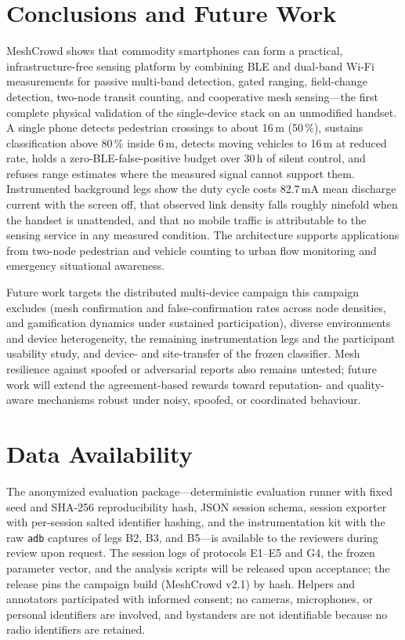 \documentclass[journal,10pt]{IEEEtran}
\begin{document}
\section{Conclusions and Future Work}
MeshCrowd shows that commodity smartphones can form a practical,
infrastructure-free sensing platform by combining BLE and dual-band Wi-Fi
measurements for passive multi-band detection, gated ranging, field-change
detection, two-node transit counting, and cooperative mesh sensing---the first
complete physical validation of the single-device stack on an unmodified
handset. A single phone detects pedestrian crossings to about 16\,m (50\,\%),
sustains classification above 80\,\% inside 6\,m, detects moving vehicles to
16\,m at reduced rate, holds a zero-BLE-false-positive budget over 30\,h of
silent control, and refuses range estimates where the measured signal cannot
support them. Instrumented background legs show the duty cycle costs 82.7\,mA
mean discharge current with the screen off, that observed link density falls
roughly ninefold when the handset is unattended, and that no mobile traffic is
attributable to the sensing service in any measured condition. The architecture
supports applications from two-node pedestrian and vehicle counting to urban
flow monitoring and emergency situational awareness.

Future work targets the distributed multi-device campaign this campaign
excludes (mesh confirmation and false-confirmation rates across node densities,
and gamification dynamics under sustained participation), diverse environments
and device heterogeneity, the remaining instrumentation legs and the
participant usability study, and device- and site-transfer of the frozen
classifier. Mesh resilience against spoofed or adversarial reports also remains
untested; future work will extend the agreement-based rewards toward
reputation- and quality-aware mechanisms robust under noisy, spoofed, or
coordinated behaviour.

\section*{Data Availability}
The anonymized evaluation package---deterministic evaluation runner with fixed
seed and SHA-256 reproducibility hash, JSON session schema, session exporter
with per-session salted identifier hashing, and the instrumentation kit with
the raw \texttt{adb} captures of legs B2, B3, and B5---is available to the
reviewers during review upon request. The session logs of protocols E1--E5 and
G4, the frozen parameter vector, and the analysis scripts will be released
upon acceptance; the release pins the campaign build (MeshCrowd v2.1) by hash.
Helpers and annotators participated with informed consent; no cameras,
microphones, or personal identifiers are involved, and bystanders are not
identifiable because no radio identifiers are retained.
\end{document}
